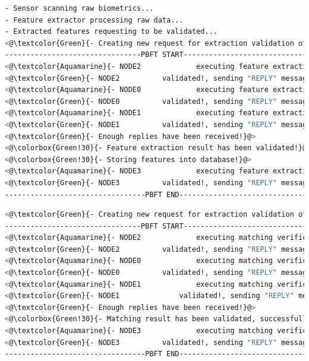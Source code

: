 \newpage
\begin{lstlisting}[language=bash, frame=single, caption={Terminal output for enrollment.},captionpos=b, label={EnrollmentSuccesTerminalOutput}]
- Sensor scanning raw biometrics...
- Feature extractor processing raw data...
- Extracted features requesting to be validated...
<@\textcolor{Green}{- Creating new request for extraction validation of SUCCESS enrollment!}@>
--------------------------------PBFT START---------------------------------
<@\textcolor{Aquamarine}{- NODE2			 executing feature extraction}@>
<@\textcolor{Green}{- NODE2 		 validated!, sending "REPLY" message!}@>
<@\textcolor{Aquamarine}{- NODE0			 executing feature extraction}@>
<@\textcolor{Green}{- NODE0 		 validated!, sending "REPLY" message!}@>
<@\textcolor{Aquamarine}{- NODE1			 executing feature extraction}@>
<@\textcolor{Green}{- NODE1 		 validated!, sending "REPLY" message!}@>
<@\textcolor{Green}{- Enough replies have been received!}@>
<@\colorbox{Green!30}{- Feature extraction result has been validated!}@>
<@\colorbox{Green!30}{- Storing features into database!}@>
<@\textcolor{Aquamarine}{- NODE3			 executing feature extraction}@>
<@\textcolor{Green}{- NODE3 		 validated!, sending "REPLY" message!}@>
---------------------------------PBFT END----------------------------------
\end{lstlisting}

\begin{lstlisting}[language=bash,frame=single,breaklines={false}, caption={Terminal output for verification.},captionpos=b, label={VerificationSuccesTerminalOutput}]
<@\textcolor{Green}{- Creating new request for extraction validation of SUCCESS verification!}@>
--------------------------------PBFT START---------------------------------
<@\textcolor{Aquamarine}{- NODE2			 executing matching verification}@>
<@\textcolor{Green}{- NODE2 		 validated!, sending "REPLY" message!}@>
<@\textcolor{Aquamarine}{- NODE0			 executing matching verification}@>
<@\textcolor{Green}{- NODE0 		 validated!, sending "REPLY" message!}@>
<@\textcolor{Aquamarine}{- NODE1			 executing matching verification}@>
<@\textcolor{Green}{- NODE1 		     validated!, sending "REPLY" message!}@>
<@\textcolor{Green}{- Enough replies have been received!}@>
<@\colorbox{Green!30}{- Matching result has been validated, successfull verification!}@>
<@\textcolor{Aquamarine}{- NODE3			 executing matching verification}@>
<@\textcolor{Green}{- NODE3 		 validated!, sending "REPLY" message!}@>
---------------------------------PBFT END----------------------------------
\end{lstlisting}

